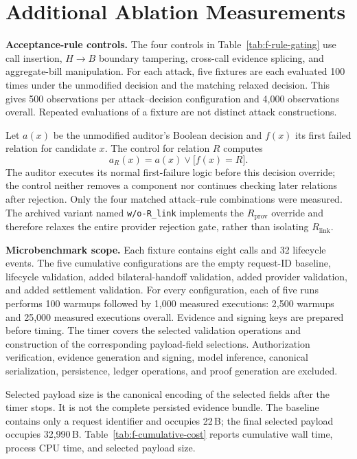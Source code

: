 \section{Additional Ablation Measurements}
\label{app:f-ablation}

\noindent\textbf{Acceptance-rule controls.}
The four controls in Table~\ref{tab:f-rule-gating} use call insertion,
$H\!\rightarrow\!B$ boundary tampering, cross-call evidence splicing,
and aggregate-bill manipulation.
For each attack, five fixtures are each evaluated 100 times under the
unmodified decision and the matching relaxed decision.
This gives 500 observations per attack--decision configuration and
4,000 observations overall.
Repeated evaluations of a fixture are not distinct attack constructions.

Let $a(x)$ be the unmodified auditor's Boolean decision and $f(x)$ its
first failed relation for candidate $x$.
The control for relation $R$ computes
\[
 a_R(x)=a(x)\lor\bigl[f(x)=R\bigr].
\]
The auditor executes its normal first-failure logic before this decision
override; the control neither removes a component nor continues checking
later relations after rejection.
Only the four matched attack--rule combinations were measured.
The archived variant named \texttt{w/o-R\_link} implements the
$R_{\mathrm{prov}}$ override and therefore relaxes the entire provider
rejection gate, rather than isolating $R_{\mathrm{link}}$.

\noindent\textbf{Microbenchmark scope.}
Each fixture contains eight calls and 32 lifecycle events.
The five cumulative configurations are the empty request-ID baseline,
lifecycle validation, added bilateral-handoff validation, added provider
validation, and added settlement validation.
For every configuration, each of five runs performs 100 warmups followed
by 1,000 measured executions: 2,500 warmups and 25,000 measured executions
overall.
Evidence and signing keys are prepared before timing.
The timer covers the selected validation operations and construction of
the corresponding payload-field selections.
Authorization verification, evidence generation and signing, model
inference, canonical serialization, persistence, ledger operations, and
proof generation are excluded.

Selected payload size is the canonical encoding of the selected fields
after the timer stops.
It is not the complete persisted evidence bundle.
The baseline contains only a request identifier and occupies 22\,B;
the final selected payload occupies 32,990\,B.
Table~\ref{tab:f-cumulative-cost} reports cumulative wall time,
process CPU time, and selected payload size.

